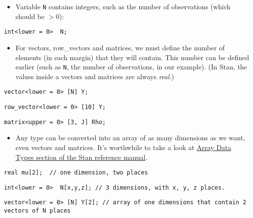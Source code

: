 \documentclass[12pt,ignorenonframetext,aspectratio=169]{beamer}
\providecommand{\tightlist}{%
  \setlength{\itemsep}{0pt}\setlength{\parskip}{0pt}}
\begin{document}
\begin{frame}[fragile]

\begin{itemize}
\tightlist
\item
  Variable \texttt{N} contains integers, such as the number of observations (which should be \(>0\)):
\end{itemize}

\texttt{int\textless{}lower\ =\ 0\textgreater{}\ \ N;}

\begin{itemize}
\tightlist
\item
  For vectors, row\_vectors and matrices, we must define the number of elements (in each margin) that they will contain. This number can be defined earlier (such as \texttt{N}, the number of observations, in our example). (In Stan, the values inside a vectors and matrices are always \emph{real}.)
\end{itemize}

\texttt{vector\textless{}lower\ =\ 0\textgreater{}\ {[}N{]}\ Y;}

\texttt{row\_vector\textless{}lower\ =\ 0\textgreater{}\ {[}10{]}\ Y;}

\texttt{matrix\textless{}upper\ =\ 0\textgreater{}\ {[}3,\ J{]}\ Rho;}

\end{frame}

\begin{frame}[fragile]

\begin{itemize}
\tightlist
\item
  Any type can be converted into an array of as many dimensions as we want, even vectors and matrices. It's worthwhile to take a look at \href{https://mc-stan.org/docs/2_22/reference-manual/array-data-types-section.html}{Array Data Types section of the Stan reference manual}.
\end{itemize}

\texttt{real\ mu{[}2{]};\ \ //\ one\ dimension,\ two\ places}

\texttt{int\textless{}lower\ =\ 0\textgreater{}\ \ N{[}x,y,z{]};\ //\ 3\ dimensions,\ with\ x,\ y,\ z\ places.}

\texttt{vector\textless{}lower\ =\ 0\textgreater{}\ {[}N{]}\ Y{[}2{]};\ //\ array\ of\ one\ dimensions\ that\ contain\ 2\ vectors\ of\ N\ places}

\end{frame}
\end{document}
